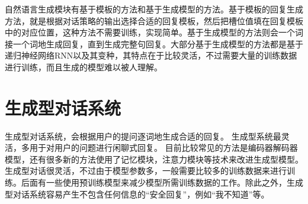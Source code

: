 自然语言生成模块有基于模板的方法和基于生成模型的方法。基于模板的回复生成方法，就是根据对话策略的输出选择合适的回复模板，然后把槽位值填在回复模板中的对应位置，这种方法不需要训练，实现简单。基于生成模型\cite{wen2015stochastic,wen2015semantically}的方法则会一个词接一个词地生成回复，直到生成完整句回复。大部分基于生成模型的方法都是基于递归神经网络RNN以及其变种，其特点在于比较灵活，不过需要大量的训练数据进行训练，而且生成的模型难以被人理解。

\section{生成型对话系统}
生成型对话系统\citep{sutskever2014sequence,shang2015neural,serban2016building,serban2016hierarchical}，会根据用户的提问逐词地生成合适的回复。
生成型系统最灵活，多用于对用户的问题进行闲聊式回复。
目前比较常见的方法是编码器解码器模型，还有很多新的方法使用了记忆模块，注意力模块等技术来改进生成型模型。
生成型对话很灵活，不过由于模型参数多，一般需要比较多的训练数据来进行训练。后面有一些使用预训练模型来减少模型所需训练数据的工作。除此之外，生成型对话系统容易产生不包含任何信息的``安全回复''，例如``我不知道''等。